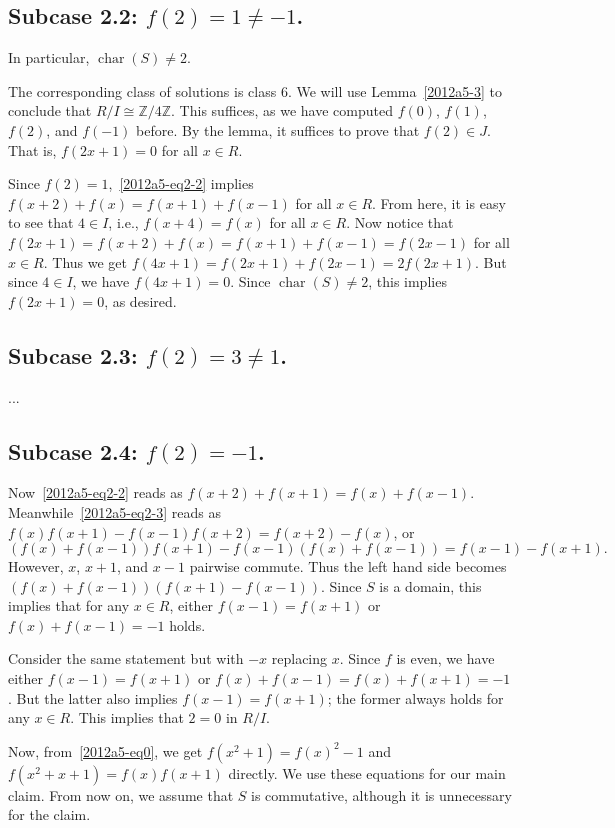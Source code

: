 \documentclass{article}
\newcommand{\Z}{\mathbb{Z}}
\DeclareMathOperator{\rchar}{char}
\begin{document}
\subsection*{Subcase 2.2: $f(2) = 1 \neq -1$.}

In particular, $\rchar(S) \neq 2$.

The corresponding class of solutions is class 6.
We will use Lemma~\ref{2012a5-3} to conclude that $R/I \cong \Z/4\Z$.
This suffices, as we have computed $f(0)$, $f(1)$, $f(2)$, and $f(-1)$ before.
By the lemma, it suffices to prove that $f(2) \in J$.
That is, $f(2x + 1) = 0$ for all $x \in R$.

Since $f(2) = 1$,~\eqref{2012a5-eq2-2} implies $f(x + 2) + f(x) = f(x + 1) + f(x - 1)$ for all $x \in R$.
From here, it is easy to see that $4 \in I$, i.e., $f(x + 4) = f(x)$ for all $x \in R$.
Now notice that $f(2x + 1) = f(x + 2) + f(x) = f(x + 1) + f(x - 1) = f(2x - 1)$ for all $x \in R$.
Thus we get $f(4x + 1) = f(2x + 1) + f(2x - 1) = 2 f(2x + 1)$.
But since $4 \in I$, we have $f(4x + 1) = 0$.
Since $\rchar(S) \neq 2$, this implies $f(2x + 1) = 0$, as desired.


\subsection*{Subcase 2.3: $f(2) = 3 \neq 1$.}

...


\subsection*{Subcase 2.4: $f(2) = -1$.}

Now~\eqref{2012a5-eq2-2} reads as $f(x + 2) + f(x + 1) = f(x) + f(x - 1)$.
Meanwhile~\eqref{2012a5-eq2-3} reads as $f(x) f(x + 1) - f(x - 1) f(x + 2) = f(x + 2) - f(x)$, or
\[ (f(x) + f(x - 1)) f(x + 1) - f(x - 1) (f(x) + f(x - 1)) = f(x - 1) - f(x + 1). \]
However, $x$, $x + 1$, and $x - 1$ pairwise commute.
Thus the left hand side becomes $(f(x) + f(x - 1)) (f(x + 1) - f(x - 1))$.
Since $S$ is a domain, this implies that for any $x \in R$, either $f(x - 1) = f(x + 1)$ or $f(x) + f(x - 1) = -1$ holds.

Consider the same statement but with $-x$ replacing $x$.
Since $f$ is even, we have either $f(x - 1) = f(x + 1)$ or $f(x) + f(x - 1) = f(x) + f(x + 1) = -1$.
But the latter also implies $f(x - 1) = f(x + 1)$; the former always holds for any $x \in R$.
This implies that $2 = 0$ in $R/I$.

Now, from~\eqref{2012a5-eq0}, we get $f(x^2 + 1) = f(x)^2 - 1$ and $f(x^2 + x + 1) = f(x) f(x + 1)$ directly.
We use these equations for our main claim.
From now on, we assume that $S$ is commutative, although it is unnecessary for the claim.
\end{document}

